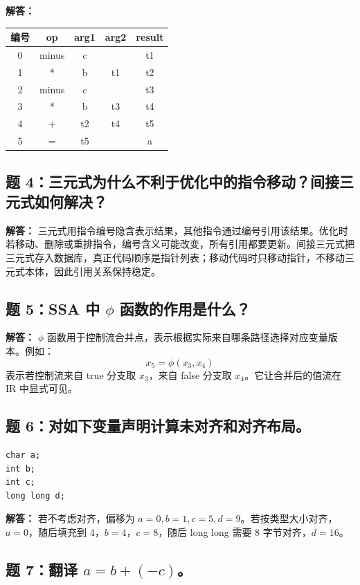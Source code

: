 \documentclass[UTF8,fontset=none,11pt]{ctexart}
\begin{document}
\textbf{解答：}
\begin{center}
\small
\begin{tabular}{c|cccc}
\toprule
编号 & op & arg1 & arg2 & result \\
\midrule
0 & minus & c &  & t1 \\
1 & * & b & t1 & t2 \\
2 & minus & c &  & t3 \\
3 & * & b & t3 & t4 \\
4 & + & t2 & t4 & t5 \\
5 & = & t5 &  & a \\
\bottomrule
\end{tabular}
\end{center}

\subsection*{题 4：三元式为什么不利于优化中的指令移动？间接三元式如何解决？}

\textbf{解答：} 三元式用指令编号隐含表示结果，其他指令通过编号引用该结果。优化时若移动、删除或重排指令，编号含义可能改变，所有引用都要更新。间接三元式把三元式存入数据库，真正代码顺序是指针列表；移动代码时只移动指针，不移动三元式本体，因此引用关系保持稳定。

\subsection*{题 5：SSA 中 \texorpdfstring{\(\phi\)}{phi} 函数的作用是什么？}

\textbf{解答：} \(\phi\) 函数用于控制流合并点，表示根据实际来自哪条路径选择对应变量版本。例如：
\[
x_5=\phi(x_3,x_4)
\]
表示若控制流来自 true 分支取 \(x_3\)，来自 false 分支取 \(x_4\)。它让合并后的值流在 IR 中显式可见。

\subsection*{题 6：对如下变量声明计算未对齐和对齐布局。}

\begin{verbatim}
char a;
int b;
int c;
long long d;
\end{verbatim}

\textbf{解答：} 若不考虑对齐，偏移为 \(a=0,b=1,c=5,d=9\)。若按类型大小对齐，\(a=0\)，随后填充到 4，\(b=4\)，\(c=8\)，随后 long long 需要 8 字节对齐，\(d=16\)。

\subsection*{题 7：翻译 \texorpdfstring{\(a=b+(-c)\)}{a=b+(-c)}。}
\end{document}
